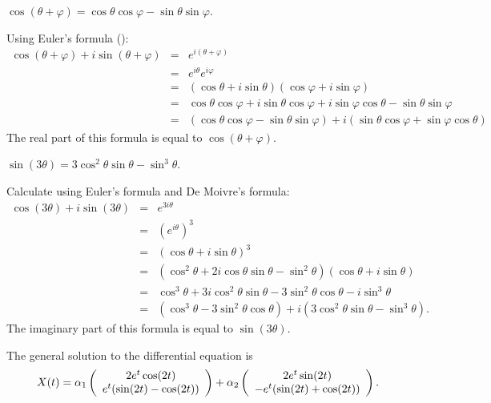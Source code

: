 \ans $\cos(\theta + \varphi) = \cos\theta\cos\varphi -
\sin\theta\sin\varphi$.

\soln Using Euler's formula ():
\[
\begin{array}{rcl}
\cos(\theta + \varphi) + i\sin(\theta + \varphi)
& = & e^{i(\theta + \varphi)} \\
& = & e^{i\theta}e^{i\varphi} \\
& = & (\cos\theta + i\sin\theta)(\cos\varphi + i\sin\varphi) \\
& = & \cos\theta\cos\varphi + i\sin\theta\cos\varphi +
i\sin\varphi\cos\theta - \sin\theta\sin\varphi \\
& = & (\cos\theta\cos\varphi - \sin\theta\sin\varphi) +
i(\sin\theta\cos\varphi + \sin\varphi\cos\theta)
\end{array}
\]
The real part of this formula is equal to $\cos(\theta + \varphi)$.

\ans $\sin(3\theta) = 3\cos^2\theta\sin\theta - \sin^3\theta$.

\soln Calculate using Euler's formula and De Moivre's formula:
\[
\begin{array}{rcl}
\cos(3\theta) + i\sin(3\theta)
& = & e^{3i\theta} \\
& = & (e^{i\theta})^3 \\
& = & (\cos\theta + i\sin\theta)^3 \\
& = & (\cos^2\theta + 2i\cos\theta\sin\theta - \sin^2\theta)
(\cos\theta + i\sin\theta) \\
& = & \cos^3\theta + 3i\cos^2\theta\sin\theta -
3\sin^2\theta\cos\theta - i\sin^3\theta \\
& = & (\cos^3\theta - 3\sin^2\theta\cos\theta) +
i(3\cos^2\theta\sin\theta - \sin^3\theta).
\end{array}
\]
The imaginary part of this formula is equal to $\sin(3\theta)$.

\ans The general solution to the differential equation is
\[
X(t) =
\alpha_1\left(\begin{array}{c} 2e^t\cos(2t) \\ e^t(\sin(2t) - \cos(2t))\end{array}\right) +
\alpha_2\left(\begin{array}{c} 2e^t\sin(2t) \\ -e^t(\sin(2t) + \cos(2t))\end{array}\right).
\]

